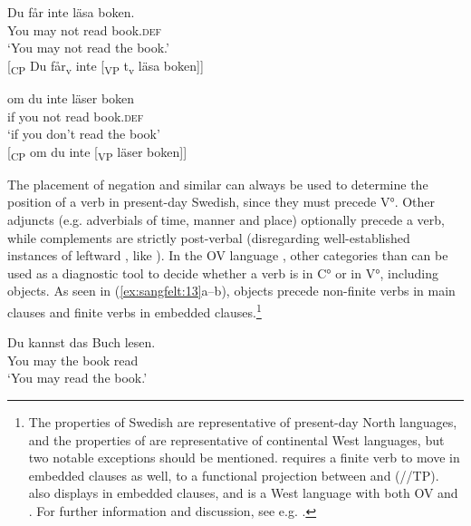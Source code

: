 \documentclass[output=paper, colorlinks, citecolor=brown]{langscibook}
\begin{document}
\ea {}\label{ex:sangfelt:12}
\begin{multicols}{2}\raggedcolumns
\ea \label{ex:sangfelt:12a}
\gll Du får inte läsa boken. \\
 You may not read book.\textsc{def}\\
\glt ‘You may not read the book.’\\

[\textsubscript{CP} Du får\textsubscript{v} inte [\textsubscript{VP} t\textsubscript{v} läsa boken]]\columnbreak

\ex\label{ex:sangfelt:12b}
\gll om du inte läser boken \\ 
 if you not read book.\textsc{def}\\
\glt ‘if you don’t read the book’\\

[\textsubscript{CP} om du inte [\textsubscript{VP} läser boken]]
\z 
\end{multicols}
\z 

The placement of negation and similar  can always be used to determine the position of a verb in present-day Swedish, since they must precede V°. Other adjuncts (e.g. adverbials of time, manner and place) optionally precede a verb, while complements are strictly post-verbal (disregarding well-established instances of leftward , like ). In the OV language , other categories than  can be used as a diagnostic tool to decide whether a verb is in C° or in V°, including objects. As seen in (\ref{ex:sangfelt:13}a–b), objects precede non-finite verbs in main clauses and finite verbs in embedded clauses.\footnote{The properties of Swedish are representative of present-day North  languages, and the properties of  are representative of continental West  languages, but two notable exceptions should be mentioned.  requires a finite verb to move in embedded clauses as well, to a functional projection between  and  (//TP).  also displays  in embedded clauses, and is a West  language with both OV and . For further information and discussion, see e.g. \citet[3–18]{Vikner2001}.}

\ea {}\label{ex:sangfelt:13}
\ea\label{ex:sangfelt:13a}
\gll Du kannst das Buch lesen.\\
 You may the book read\\
\glt ‘You may read the book.’\\
\end{document}
